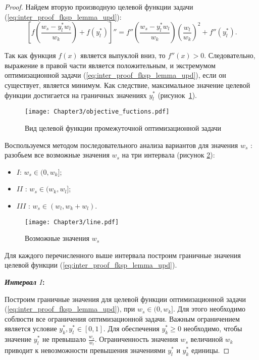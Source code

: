 \begin{proof}
Найдем вторую производную целевой функции задачи (\ref{eq:inter_proof_fksp_lemma_upd}):
$$\left[f\left(\frac{w_s - y_l^{*} w_l}{w_k}\right) + f(y_l^{*})\right]'' = f''\left(\frac{w_s - y_l^{*} w_l}{w_k}\right) \left(\frac{w_l}{w_k}\right)^2 + f''(y_l^{*}).$$

Так как функция $f(x)$ является выпуклой вниз, то $f''(x) > 0$. Следовательно, выражение в правой части является положительным, и экстремумом оптимизационной задачи (\ref{eq:inter_proof_fksp_lemma_upd}), если он существует, является минимум. Как следствие, максимальное значение целевой функции достигается на граничных значениях $y_l^{*}$ (рисунок~\ref{fig:ObjectiveFunctions}).

\begin{figure}[htbp]
\begin{center}
\texttt{[image: Chapter3/objective\_fuctions.pdf]}
\caption{Вид целевой функции промежуточной оптимизационной задачи}
\label{fig:ObjectiveFunctions}
\end{center}
\end{figure}

Воспользуемся методом последовательного анализа вариантов для значения $w_s$ \cite{optimizations_methods}: разобьем все возможные значения $w_s$ на три интервала (рисунок \ref{fig:line}):
\begin{itemize}
	\item $I$: $w_s \in (0, w_k]$;
	\item $II$ : $w_s \in (w_k, w_l]$;
	\item $III$ : $w_s \in (w_l, w_k+w_l)$.
\end{itemize}

\begin{figure}[h!]
\begin{center}
\texttt{[image: Chapter3/line.pdf]}
\caption{Возможные значения $w_s$}
\label{fig:line}
\end{center}
\end{figure}

Для каждого перечисленного выше интервала построим граничные значения целевой функции (\ref{eq:inter_proof_fksp_lemma_upd}).

\textbf{\textit{Интервал $I$}:}

Построим граничные значения для целевой функции оптимизационной задачи (\ref{eq:inter_proof_fksp_lemma_upd}), при $w_s \in (0, w_k]$. Для этого необходимо соблюсти все ограничения оптимизационной задачи. Важным ограничением является условие $y_k^{*},y_l^{*} \in [0,1]$. Для обеспечения $y_k^{*} \geq 0$ необходимо, чтобы значение $y_l^{*}$ не превышало $\frac{w_s}{w_l}$. Ограниченность значения $w_s$ величиной $w_k$ приводит к невозможности превышения значениями $y_l^{*}$ и $y_k^{*}$ единицы.


\end{proof}
